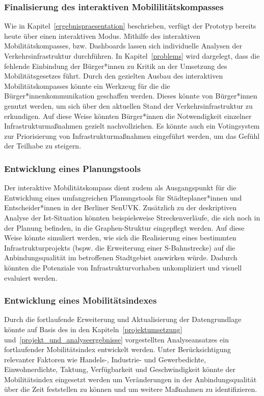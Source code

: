 \subsubsection{Finalisierung des interaktiven Mobililitätskompasses}
Wie in Kapitel~\ref{ergebnispraesentation} beschrieben, verfügt der Prototyp bereits heute über einen interaktiven Modus. Mithilfe des interaktiven Mobilitätskompasses, bzw. Dashboards lassen sich individuelle Analysen der Verkehrsinfrastruktur durchführen. In Kapitel~\ref{problems} wird dargelegt, dass die fehlende Einbindung der Bürger*innen zu Kritik an der Umsetzung des Mobilitätsgesetzes führt. Durch den gezielten Ausbau des interaktiven Mobilitätskompasses könnte ein Werkzeug für die die Bürger*innenkommunikation geschaffen werden. Dieses könnte von Bürger*innen genutzt werden, um sich über den aktuellen Stand der Verkehrsinfrastruktur zu erkundigen. Auf diese Weise könnten Bürger*innen die Notwendigkeit einzelner Infrastrukturmaßnahmen gezielt nachvollziehen. Es könnte auch ein Votingsystem zur Priorisierung von Infrastrukturmaßnahmen eingeführt werden, um das Gefühl der Teilhabe zu steigern.


\subsubsection{Entwicklung eines Planungstools}
Der interaktive Mobilitätskompass dient zudem als Ausgangspunkt für die Entwicklung eines umfangreichen Planungstools für Städteplaner*innen und Entscheider*innen in der Berliner \ac{SenUVK}. Zusätzlich zu der deskriptiven Analyse der Ist-Situation könnten beispielsweise Streckenverläufe, die sich noch in der Planung befinden, in die Graphen-Struktur eingepflegt werden. Auf diese Weise könnte simuliert werden, wie sich die Realisierung eines bestimmten Infrastrukturprojekts (bspw. die Erweiterung einer S-Bahnstrecke) auf die Anbindungsqualität im betroffenen Stadtgebiet auswirken würde. Dadurch könnten die Potenziale von Infrastrukturvorhaben unkompliziert und visuell evaluiert werden.

\subsubsection{Entwicklung eines Mobilitätsindexes}\label{mobwob_index}
Durch die fortlaufende Erweiterung und Aktualisierung der Datengrundlage könnte auf Basis des in den Kapiteln~\ref{projektumsetzung} und~\ref{projekt_und_analyseergebnisse} vorgestellten Analyseansatzes ein fortlaufender Mobilitätsindex entwickelt werden. Unter Berücksichtigung relevanter Faktoren wie Handels-, Industrie- und Gewerbedichte, Einwohnerdichte, Taktung, Verfügbarkeit und Geschwindigkeit könnte der Mobilitätsindex eingesetzt werden um Veränderungen in der Anbindungsqualität über die Zeit feststellen zu können und um weitere Maßnahmen zu identifizieren.

